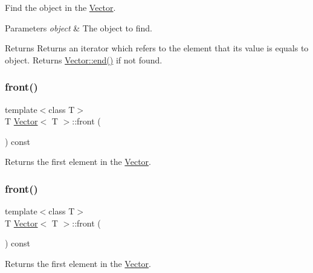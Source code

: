 Find the object in the \hyperlink{classVector}{Vector}. 


\begin{DoxyParams}{Parameters}
{\em object} & The object to find. \\
\hline
\end{DoxyParams}
\begin{DoxyReturn}{Returns}
Returns an iterator which refers to the element that its value is equals to object. Returns \hyperlink{classVector_ae288fa619188bff101d5300b8aaf9a90}{Vector\+::end()} if not found. 
\end{DoxyReturn}
\mbox{\label{classVector_a237ab21eb5459aa729d157c27606725d}} 
\subsubsection{\texorpdfstring{front()}{front()}\hspace{0.1cm}{\footnotesize\ttfamily [1/2]}}
{\footnotesize\ttfamily template$<$class T$>$ \\
T \hyperlink{classVector}{Vector}$<$ T $>$\+::front (\begin{DoxyParamCaption}{ }\end{DoxyParamCaption}) const\hspace{0.3cm}{\ttfamily [inline]}}

Returns the first element in the \hyperlink{classVector}{Vector}. \mbox{\label{classVector_a237ab21eb5459aa729d157c27606725d}} 
\subsubsection{\texorpdfstring{front()}{front()}\hspace{0.1cm}{\footnotesize\ttfamily [2/2]}}
{\footnotesize\ttfamily template$<$class T$>$ \\
T \hyperlink{classVector}{Vector}$<$ T $>$\+::front (\begin{DoxyParamCaption}{ }\end{DoxyParamCaption}) const\hspace{0.3cm}{\ttfamily [inline]}}

Returns the first element in the \hyperlink{classVector}{Vector}. \mbox{\label{classVector_a21b8c98af0c86216bdee67ec581abc13}} 
